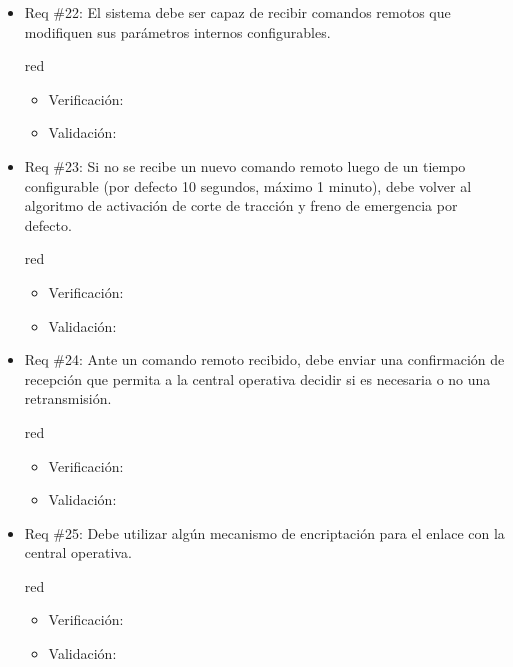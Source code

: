\documentclass[11pt]{charter}
\begin{document}
\begin{itemize}
\item Req \#22: El sistema debe ser capaz de recibir comandos remotos que modifiquen sus parámetros internos configurables.
\begin{consigna}{red}
\begin{itemize}
  \item Verificación:\\
  \item Validación:\\
\end{itemize}
\end{consigna}

\item Req \#23: Si no se recibe un nuevo comando remoto luego de un tiempo configurable (por defecto 10 segundos, máximo 1 minuto), debe volver al algoritmo de activación de corte de tracción y freno de emergencia por defecto.
\begin{consigna}{red}
\begin{itemize}
  \item Verificación:\\
  \item Validación:\\
\end{itemize}
\end{consigna}

\item Req \#24: Ante un comando remoto recibido, debe enviar una confirmación de recepción que permita a la central operativa decidir si es necesaria o no una retransmisión.
\begin{consigna}{red}
\begin{itemize}
  \item Verificación:\\
  \item Validación:\\
\end{itemize}
\end{consigna}

\item Req \#25: Debe utilizar algún mecanismo de encriptación para el enlace con la central operativa.
\begin{consigna}{red}
\begin{itemize}
  \item Verificación:\\
  \item Validación:\\
\end{itemize}
\end{consigna}


\end{itemize}
\end{document}

